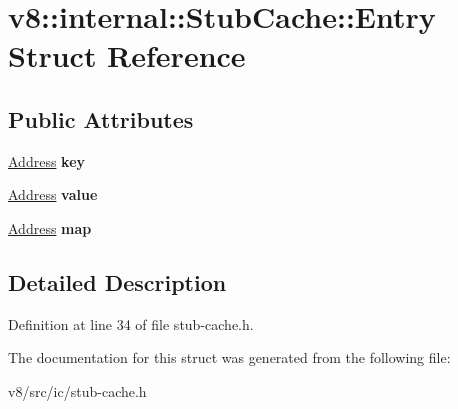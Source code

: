\hypertarget{structv8_1_1internal_1_1StubCache_1_1Entry}{}\section{v8\+:\+:internal\+:\+:Stub\+Cache\+:\+:Entry Struct Reference}
\label{structv8_1_1internal_1_1StubCache_1_1Entry}
\subsection*{Public Attributes}
\begin{DoxyCompactItemize}
\item 
\mbox{\label{structv8_1_1internal_1_1StubCache_1_1Entry_a417c0c29b25913755b1cfda21567ca96}} 
\mbox{\hyperlink{classuintptr__t}{Address}} {\bfseries key}
\item 
\mbox{\label{structv8_1_1internal_1_1StubCache_1_1Entry_a5da42f01b5076513698238aba644dcf9}} 
\mbox{\hyperlink{classuintptr__t}{Address}} {\bfseries value}
\item 
\mbox{\label{structv8_1_1internal_1_1StubCache_1_1Entry_a16510ee41b2ea77fe4384de7b72ffe4f}} 
\mbox{\hyperlink{classuintptr__t}{Address}} {\bfseries map}
\end{DoxyCompactItemize}


\subsection{Detailed Description}


Definition at line 34 of file stub-\/cache.\+h.



The documentation for this struct was generated from the following file\+:\begin{DoxyCompactItemize}
\item 
v8/src/ic/stub-\/cache.\+h\end{DoxyCompactItemize}
